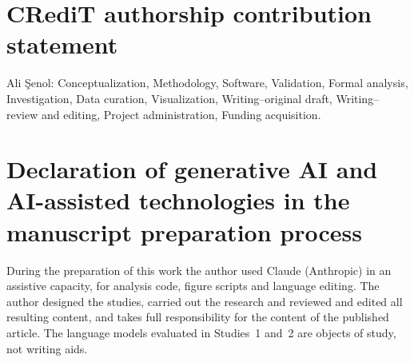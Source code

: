 \documentclass[preprint,11pt,authoryear]{elsarticle}
\begin{document}
\section*{CRediT authorship contribution statement}
Ali \c{S}enol: Conceptualization, Methodology, Software, Validation, Formal
analysis, Investigation, Data curation, Visualization, Writing--original draft,
Writing--review and editing, Project administration, Funding acquisition.

\section*{Declaration of generative AI and AI-assisted technologies in the manuscript preparation process}
During the preparation of this work the author used Claude (Anthropic) in an
assistive capacity, for analysis code, figure scripts and language editing. The
author designed the studies, carried out the research and reviewed and edited
all resulting content, and takes full responsibility for the content of the
published article. The language models evaluated in Studies~1 and~2 are
objects of study, not writing aids.



\end{document}
